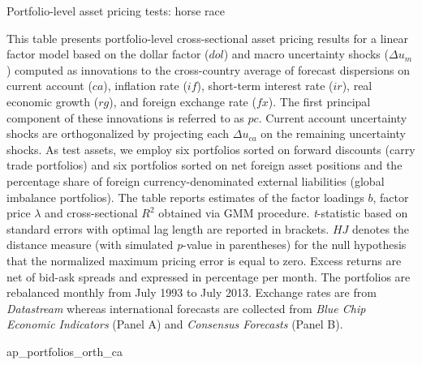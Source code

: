 \begin{landscape}
	
	\begin{table}[ht]
		\caption{Portfolio-level asset pricing tests: horse race} \label{tab:ap_portfolios_orth_ca}
		\begin{footnotesize}
			This table presents portfolio-level cross-sectional asset pricing results for a linear factor model based on the dollar factor ($dol$) and macro uncertainty shocks ($\Delta u_{m}$) computed as innovations to the cross-country average of forecast dispersions on current account ($ca$), inflation rate ($if$), short-term interest rate ($ir$), real economic growth ($rg$), and foreign exchange rate ($fx$). The first principal component of these innovations is referred to as $pc$. Current account uncertainty shocks are orthogonalized by projecting each $\Delta u_{ca}$ on the remaining uncertainty shocks. As test assets, we employ six portfolios sorted on forward discounts (carry trade portfolios) and six portfolios sorted on net foreign asset positions and the percentage share of foreign currency-denominated external liabilities (global imbalance portfolios). The table reports estimates of the factor loadings $b$, factor price $\lambda$ and cross-sectional $R^{2}$ obtained via GMM procedure. \emph{t}-statistic based on \citet{newey_west1987} standard errors with \citet{andrews1991} optimal lag length are reported in brackets. $HJ$ denotes the \citet{hansen/jagannathan:97} distance measure (with simulated \emph{p}-value in parentheses) for the null hypothesis that the normalized maximum pricing error is equal to zero. Excess returns are net of bid-ask spreads and expressed in percentage per month. The portfolios are rebalanced monthly from July 1993 to July 2013. Exchange rates are from \textit{Datastream} whereas international forecasts are collected from \textit{Blue Chip Economic Indicators} (Panel A) and \textit{Consensus Forecasts} (Panel B).
		\end{footnotesize}
		
		{ap_portfolios_orth_ca}
	\end{table}	
	
\end{landscape}

